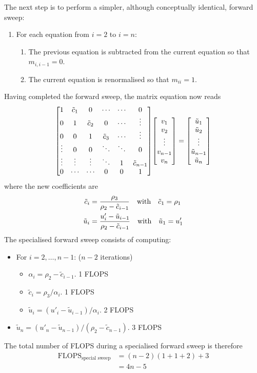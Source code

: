 \documentclass[reprint,english]{revtex4-1}
\begin{document}
The next step is to perform a simpler, although conceptually identical, forward sweep:
\begin{enumerate}
\item[] For each equation from \(i=2\) to \(i=n\):
\begin{enumerate}
	\item The previous equation is subtracted from the current equation so that \(m_{i,i-1}=0\).
	\item The current equation is renormalised so that \(m_{ii}=1\).
\end{enumerate}
\end{enumerate}
Having completed the forward sweep, the matrix equation now reads
\[\mqty[1 & \tilde{c}_1 & 0 & \cdots & \cdots & 0 \\
0 & 1 & \tilde{c}_2 & 0 & \cdots & \vdots \\
0 & 0 & 1 & \tilde{c}_3 & \cdots & \vdots \\
\vdots & 0 & 0 & \ddots & \ddots & 0 \\
\vdots & \vdots & \vdots & \ddots & 1 & \tilde{c}_{n-1} \\
0 & \cdots & \cdots & 0 & 0 & 1]\mqty[v_1 \\ v_2 \\ \vdots \\ v_{n-1} \\ v_n]=\mqty[\tilde{u}_1 \\ \tilde{u}_2 \\ \vdots \\ \tilde{u}_{n-1} \\ \tilde{u}_n]\]
where the new coefficients are
\begin{align}
\tilde{c}_i&=\frac{\rho_3}{\rho_2-\tilde{c}_{i-1}}\qq{with}\tilde{c}_1=\rho_1\\
\tilde{u}_i&=\frac{u'_i-\tilde{u}_{i-1}}{\rho_2-\tilde{c}_{i-1}}\qq{with}\tilde{u}_1=u'_1
\end{align}
\noindent The specialised forward sweep consists of computing:
\begin{itemize}
\renewcommand\labelitemi{\(\times\)}
\renewcommand\labelitemii{\(\to\)}
\item For \(i=2,\ldots,n-1\): (\(n-2\) iterations)
	\begin{itemize}
	\item \(\alpha_i=\rho_2-\tilde{c}_{i-1}\). 1 FLOPS
	\item \(\tilde{c}_i=\rho_3/\alpha_i\). 1 FLOPS
	\item \(\tilde{u}_i=(u'_i-\tilde{u}_{i-1})/\alpha_i\). 2 FLOPS
	\end{itemize}
\item \(\tilde{u}_n=(u'_n-\tilde{u}_{n-1})/(\rho_2-\tilde{c}_{n-1})\). 3 FLOPS
\end{itemize}
The total number of FLOPS during a specialised forward sweep is therefore
\begin{align}
\text{FLOPS}_{\text{special sweep}}&=(n-2)(1+1+2)+3\nonumber\\
&=4n-5
\end{align}
\end{document}
